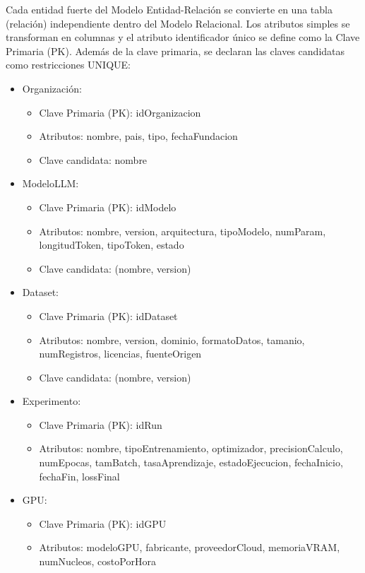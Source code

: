 \documentclass[12pt,a4paper]{article}
\begin{document}
Cada entidad fuerte del Modelo Entidad-Relación se convierte en una tabla (relación) independiente dentro del Modelo Relacional. Los atributos simples se transforman en columnas y el atributo identificador único se define como la Clave Primaria (PK). Además de la clave primaria, se declaran las claves candidatas como restricciones UNIQUE:
{\begin{itemize}
  \item Organización:
  \begin{itemize}
  \item Clave Primaria (PK): idOrganizacion
  \item Atributos: nombre, pais, tipo, fechaFundacion
  \item Clave candidata: nombre
  \end{itemize}
  \item ModeloLLM:
  \begin{itemize}
  \item Clave Primaria (PK): idModelo
  \item Atributos: nombre, version, arquitectura, tipoModelo, numParam, longitudToken, tipoToken, estado
  \item Clave candidata: (nombre, version)
  \end{itemize}
  \item Dataset:
  \begin{itemize}
  \item Clave Primaria (PK): idDataset
  \item Atributos: nombre, version, dominio, formatoDatos, tamanio, numRegistros, licencias, fuenteOrigen
  \item Clave candidata: (nombre, version)
  \end{itemize}
  \item Experimento:
  \begin{itemize}
  \item Clave Primaria (PK): idRun
  \item Atributos: nombre, tipoEntrenamiento, optimizador, precisionCalculo, numEpocas, tamBatch, tasaAprendizaje, estadoEjecucion, fechaInicio, fechaFin, lossFinal
  \end{itemize}
  \item GPU:
  \begin{itemize}
  \item Clave Primaria (PK): idGPU
  \item Atributos: modeloGPU, fabricante, proveedorCloud, memoriaVRAM, numNucleos, costoPorHora
  \end{itemize}

\end{itemize}}
\end{document}
